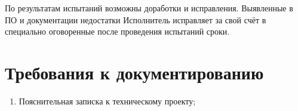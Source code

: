 По результатам испытаний возможны доработки и исправления. Выявленные в ПО и документации 
недостатки Исполнитель исправляет за свой счёт в специально оговоренные после проведения 
испытаний сроки.

\chapter{Требования к документированию}
\begin{enumerate}
    \item Пояснительная записка к техническому проекту;
\end{enumerate}

\setlength\parindent{15mm}
\stopcontents[sections]